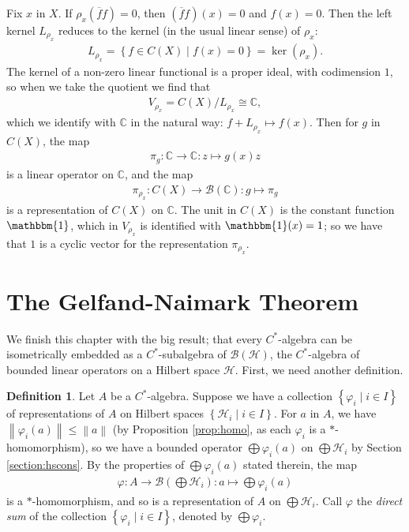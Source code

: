 \documentclass[11pt,a4paper]{report}
\theoremstyle{plain}
\theoremstyle{definition}
\newtheorem{defn}{Definition}
\newcommand{\1}{\mathbbm{1}}
\newcommand{\C}{\mathbb{C}}
\renewcommand{\H}{\mathcal{H}}
\newcommand{\B}{\mathcal{B}}
\newcommand{\BH}{\mathcal{\B(\H)}}
\renewcommand{\phi}{\varphi}
\newcommand{\CX}{C(X)}
\renewcommand{\bar}{\overline}
\renewcommand{\oplus}{\textstyle\bigoplus}
\begin{document}
Fix $x$ in $X$. If $\rho_x(\bar f f)=0$, then $(\bar f f)(x)=0$ and $f(x)=0$. 
Then the left kernel $L_{\rho_x}$ reduces to the kernel (in the usual linear 
sense) of $\rho_x$:
\begin{align*}
	L_{\rho_x} = \left\{f\in\CX \mid f(x) = 0\right\} = \ker(\rho_x).
\end{align*}
The kernel of a non-zero linear functional is a proper ideal, with codimension 
$1$, so when we take the quotient we find that 
\begin{align*}
	V_{\rho_x} = \CX/L_{\rho_x} \cong \C,
\end{align*}
which we identify with $\C$ in the natural way: $f+L_{\rho_x} \mapsto f(x)$.
Then for $g$ in $\CX$, the map 
\begin{align*}
	\pi_g:\C\to\C:z\mapsto g(x)z
\end{align*} 
is a linear operator on $\C$, and the map 
\begin{align*}
	\pi_{\rho_x}:\CX\to\B(\C):g\mapsto\pi_g
\end{align*} 
is a representation of $\CX$ on $\C$. The unit in $\CX$ is the constant function 
$\1$, which in $V_{\rho_x}$ is identified with $\1(x)=1$; so we have that $1$ is 
a cyclic vector for the representation $\pi_{\rho_x}$.


\section{The Gelfand-Naimark Theorem}\label{section:gn}
We finish this chapter with the big result; that every $C^\ast$-algebra can be 
isometrically embedded as a $C^\ast$-subalgebra of $\BH$, the $C^\ast$-algebra 
of bounded linear operators on a Hilbert space $\H$. First, we need another 
definition.

\begin{defn}
	Let $A$ be a $C^\ast$-algebra. Suppose we have a collection $\left\{\phi_i \mid 
	i\in I\right\}$ of representations of $A$ on Hilbert spaces $\left\{\H_i \mid 
	i\in I\right\}$. For $a$ in $A$, we have $\left\|\phi_i(a)\right\| \leq 
	\left\|a\right\|$ (by Proposition \ref{prop:homo}, as each $\phi_i$ is a 
	$\ast$-homomorphism), so we have a bounded operator $\oplus\phi_i(a)$ on $\oplus 
	\H_i$ by Section \ref{section:hscons}. By the properties of $\oplus\phi_i(a)$ 
	stated therein, the map
	\begin{align*}
		\phi:A\to \B(\oplus\H_i):a\mapsto\oplus\phi_i(a)
	\end{align*}
	is a $\ast$-homomorphism, and so is a representation of $A$ on $\oplus\H_i$. 
	Call $\phi$ the \emph{direct sum} of the collection $\left\{\phi_i \mid i\in 
	I\right\}$, denoted by $\oplus\phi_i$.

\end{defn}
\end{document}
